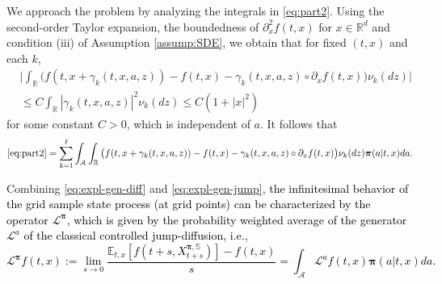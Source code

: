 \documentclass[11pt]{article}
\newcommand{\1}{\mathbbm{1}}
\newcommand{\bpi}{\boldsymbol{\pi}}
\newcommand{\rev}[1]{\textcolor{black}{{#1}}} %
\begin{document}
We approach the problem by analyzing the integrals in  \eqref{eq:part2}.  Using the second-order Taylor expansion, the boundedness of $\partial^2_x f(t,x)$ for $x\in\mathbb{R}^d$ and condition (iii) of Assumption \ref{assump:SDE}, we obtain that for fixed $(t,x)$ and each $k$,
\begin{align}
	&\Big|\int_{\mathbb{R}} \big( f(t, x+ \gamma_k(t, x ,a, z)) - f(t,x) - \gamma_k(t,x,a,z) \circ \partial_xf(t,x) \big) \nu_k (dz)\Big|\\
	&\leq C \int_{\mathbb{R}}|\gamma_k(t,x,a,z)|^2\nu_k(dz)\leq C(1+|x|^2) \label{eq:bound-for-Fubini}
\end{align}
for some constant $C>0$, which is independent of $a$. It follows that
\begin{equation}
	\eqref{eq:part2}=\sum_{k=1}^\ell \int_{\mathcal{A}}\int_{\mathbb{R}} \big( f(t, x+ \gamma_k(t, x ,a, z)) - f(t,x) - \gamma_k(t,x,a,z) \circ  \partial_xf (t,x) \big) \nu_k (dz)\bpi(a | t,x)da.\label{eq:expl-gen-jump}
\end{equation}

Combining \eqref{eq:expl-gen-diff} and \eqref{eq:expl-gen-jump}, \rev{the infinitesimal behavior of the grid sample state process (at grid points) can be characterized by the operator $\mathcal{L}^{\bpi}$, which is given by the probability weighted average of the generator $\mathcal{L}^a$ of the classical controlled jump-diffusion, i.e.,
\begin{equation}\label{eq:expl-gen-1}
	\mathcal{L}^{\bpi}f(t,x) := \lim_{s\to 0}\frac{\mathbb{E}_{t,x}[f(t+s, X_{t+s}^{\bpi, \mathbb{S}})]-f(t,x)}{s} = \int_{\mathcal{A}}\mathcal{L}^a f(t,x)\bpi(a|t,x)da.
\end{equation}}
\end{document}
